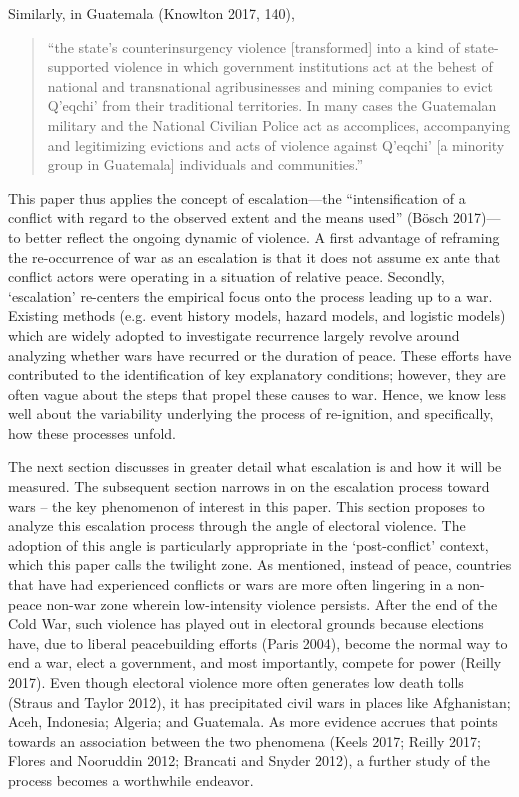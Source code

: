 \documentclass [11pt]{article}
\begin{document}
Similarly, in Guatemala (Knowlton 2017, 140),

\begin{quote}
``the state’s counterinsurgency violence [transformed] into a kind of state-supported violence in which government institutions act at the behest of national and transnational agribusinesses and mining companies to evict Q’eqchi’ from their traditional territories. In many cases the Guatemalan military and the National Civilian Police act as accomplices, accompanying and legitimizing evictions and acts of violence against Q’eqchi’ [a minority group in Guatemala] individuals and communities.''
\end{quote}




This paper thus applies the concept of escalation—the “intensification of a conflict with regard to the observed extent and the means used” (Bösch 2017)—to better reflect the ongoing dynamic of violence. A first advantage of reframing the re-occurrence of war as an escalation is that it does not assume ex ante that conflict actors were operating in a situation of relative peace. Secondly, ‘escalation’ re-centers the empirical focus onto the process leading up to a war. Existing methods (e.g. event history models, hazard models, and logistic models) which are widely adopted to investigate recurrence largely revolve around analyzing whether wars have recurred or the duration of peace. These efforts have contributed to the identification of key explanatory conditions; however, they are often vague about the steps that propel these causes to war. Hence, we know less well about the variability underlying the process of re-ignition, and specifically, how these processes unfold.

The next section discusses in greater detail what escalation is and how it will be measured. The subsequent section narrows in on the escalation process toward wars – the key phenomenon of interest in this paper. This section proposes to analyze this escalation process through the angle of electoral violence. The adoption of this angle is particularly appropriate in the ‘post-conflict’ context, which this paper calls the twilight zone. As mentioned, instead of peace, countries that have had experienced conflicts or wars are more often lingering in a non-peace non-war zone wherein low-intensity violence persists. After the end of the Cold War, such violence has played out in electoral grounds because elections have, due to liberal peacebuilding efforts (Paris 2004), become the normal way to end a war, elect a government, and most importantly, compete for power (Reilly 2017). Even though electoral violence more often generates low death tolls (Straus and Taylor 2012), it has precipitated civil wars in places like Afghanistan; Aceh, Indonesia; Algeria; and Guatemala. As more evidence accrues that points towards an association between the two phenomena (Keels 2017; Reilly 2017; Flores and Nooruddin 2012; Brancati and Snyder 2012), a further study of the process becomes a worthwhile endeavor.
\end{document}
